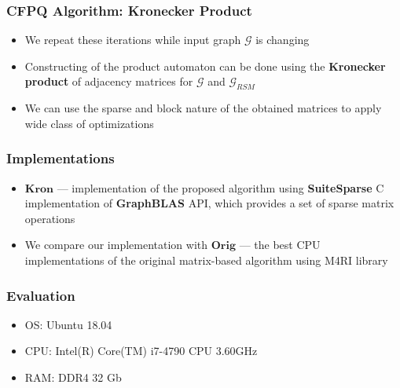 \documentclass[xcolor=table]{beamer}
\begin{document}
\begin{frame}[fragile] \frametitle{CFPQ Algorithm: Kronecker Product}
\begin{itemize}
	\item We repeat these iterations while input graph $\mathcal{G}$ is changing
	\item Constructing of the product automaton can be done using the \textbf{Kronecker product} of adjacency matrices for $\mathcal{G}$ and $\mathcal{G}_{RSM}$
	\item We can use the sparse and block nature of the obtained matrices to apply wide class of optimizations
\end{itemize}
\end{frame}

\begin{frame}[fragile] \frametitle{Implementations}

\begin{itemize}
	\item $\textbf{Kron}$ --- implementation of the proposed algorithm using \textbf{SuiteSparse} C implementation of \textbf{GraphBLAS} API, which provides a set of sparse matrix operations
	\pause
	\item We compare our implementation with $\textbf{Orig}$ --- the best CPU implementations of the original matrix-based algorithm using M4RI library
\end{itemize}
\end{frame}

\begin{frame} \frametitle{Evaluation}
\begin{itemize}
	\item OS: Ubuntu 18.04
	\item CPU: Intel(R) Core(TM) i7-4790 CPU 3.60GHz
	\item RAM: DDR4 32 Gb
\end{itemize}
\end{frame}
\end{document}
